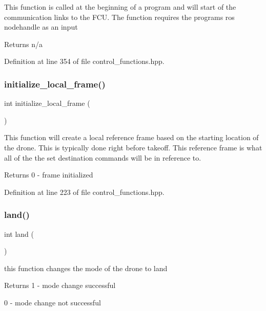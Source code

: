 This function is called at the beginning of a program and will start of the communication links to the F\+CU. The function requires the program\textquotesingle{}s ros nodehandle as an input \begin{DoxyReturn}{Returns}
n/a 
\end{DoxyReturn}


Definition at line 354 of file control\+\_\+functions.\+hpp.

\mbox{\label{group__control__functions_ga2a1100bb15673a9322c5be3bb8e9999f}} 
\subsubsection{\texorpdfstring{initialize\_local\_frame()}{initialize\_local\_frame()}}
{\footnotesize\ttfamily int initialize\+\_\+local\+\_\+frame (\begin{DoxyParamCaption}{ }\end{DoxyParamCaption})}

This function will create a local reference frame based on the starting location of the drone. This is typically done right before takeoff. This reference frame is what all of the the set destination commands will be in reference to. \begin{DoxyReturn}{Returns}
0 -\/ frame initialized 
\end{DoxyReturn}


Definition at line 223 of file control\+\_\+functions.\+hpp.

\mbox{\label{group__control__functions_ga52a11a139e56315de52d2ab439b0d203}} 
\subsubsection{\texorpdfstring{land()}{land()}}
{\footnotesize\ttfamily int land (\begin{DoxyParamCaption}{ }\end{DoxyParamCaption})}

this function changes the mode of the drone to land \begin{DoxyReturn}{Returns}
1 -\/ mode change successful 

0 -\/ mode change not successful 
\end{DoxyReturn}


